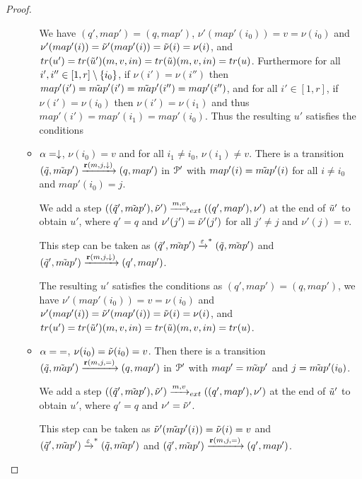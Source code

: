\begin{proof}
\begin{itemize}
\begin{itemize}
			 We have $(q', map') = (q, map')$, $\nu'(map'(i_0)) = v = \nu(i_0)$ and $\nu'(map'(i)) = \Tilde{\nu}'(map'(i)) = \Tilde{\nu}(i) = \nu(i)$, and $\trace{u'} = \trace{\Tilde{u}'} (m,v,in) = \trace{\Tilde{u}} (m,v,in) = \trace{u}$.
			 Furthermore for all $i', i'' \in [1,r]\setminus\{i_0\}$, if $\nu(i') = \nu(i'')$ then $map'(i') = \Tilde{map}'(i') = \Tilde{map}'(i'') = map'(i'')$, and for all $i' \in [1,r]$, if $\nu(i')=\nu(i_0)$ then $\nu(i')=\nu(i_1)$ and thus $map'(i') = map'(i_1) = map'(i_0)$.
			 Thus the resulting $u'$ satisfies the conditions
			
			\item $\alpha=\downarrow$, $\nu(i_0) = v$ and for all $i_1 \neq i_0$, $\nu(i_1) \neq v$. 
			There is a transition $(\Tilde{q}, \Tilde{map}') \xrightarrow{\textbf{r}(m, j, \downarrow)} (q, map')$ in $\mathcal{P}'$ with $map'(i) = \Tilde{map}'(i)$ for all $i\neq i_0$ and $map'(i_0) = j$.
			
			We add a step $((\Tilde{q}', \Tilde{map}'), \Tilde{\nu}') \xrightarrow{m, v}_{ext} ((q', map'), \nu')$ at the end of $\Tilde{u}'$ to obtain $u'$, where $q' = q$ and $\nu'(j') = \Tilde{\nu}'(j')$ for all $j' \neq j$ and $\nu'(j) = v$.
			
			This step can be taken as $(\Tilde{q}', \Tilde{map}') \xrightarrow{\varepsilon}^* (\Tilde{q}, \Tilde{map}')$ and $(\Tilde{q}', \Tilde{map}') \xrightarrow{\textbf{r}(m, j, \downarrow)} (q', map')$. 
			
			The resulting $u'$ satisfies the conditions as $(q', map') = (q, map')$, we have $\nu'(map'(i_0)) = v = \nu(i_0)$ and $\nu'(map'(i)) = \Tilde{\nu}'(map'(i)) = \Tilde{\nu}(i) = \nu(i)$, and $\trace{u'} = \trace{\Tilde{u}'} (m,v,in) = \trace{\Tilde{u}} (m,v,in) = \trace{u}$.
			
			\item $\alpha = {=}$, $\nu(i_0) = \Tilde{\nu}(i_0) = v$. Then there is a transition $(\Tilde{q}, \Tilde{map}') \xrightarrow{\textbf{r}(m, j, {=})} (q, map')$ in $\mathcal{P}'$ with $map' = \Tilde{map}'$ and $j = \Tilde{map}'(i_0)$.
			
			We add a step $((\Tilde{q}', \Tilde{map}'), \Tilde{\nu}') \xrightarrow{m, v}_{ext} ((q', map'), \nu')$ at the end of $\Tilde{u}'$ to obtain $u'$, where $q' = q$ and $\nu' = \Tilde{\nu}'$.
			
			This step can be taken as $\Tilde{\nu}'(\Tilde{map}'(i)) = \Tilde{\nu}(i) = v$ and $(\Tilde{q}', \Tilde{map}') \xrightarrow{\varepsilon}^* (\Tilde{q}, \Tilde{map}')$ and $(\Tilde{q}', \Tilde{map}') \xrightarrow{\textbf{r}(m, j, {=})} (q', map')$.
			

\end{itemize}
\end{itemize}
\end{proof}
